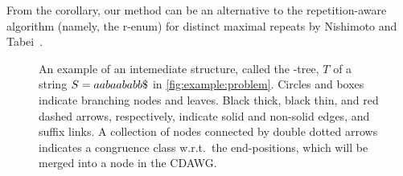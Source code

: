 


From the corollary, our method can be an alternative to the repetition-aware algorithm (namely, the r-enum) for distinct maximal repeats by Nishimoto and Tabei~\cite{nishimoto:cpm2021enum}.



\begin{figure}[t]
\centering
\begin{minipage}[c]{0.42\textwidth}
\centering
{}
\end{minipage}
\caption{An example of an intemediate structure, called the \LPTrm-tree, $T$ of a string $S = aabaababb\daller$ in \cref{fig:example:problem}.
Circles and boxes indicate branching nodes and leaves. Black thick, black thin, and red dashed arrows, respectively, indicate solid and non-solid edges, and suffix links.
  A collection of nodes connected by double dotted arrows indicates a congruence class w.r.t.~the end-positions, which will be merged into a node in the CDAWG. 
}\label{fig:example:lpttree}
\end{figure}

